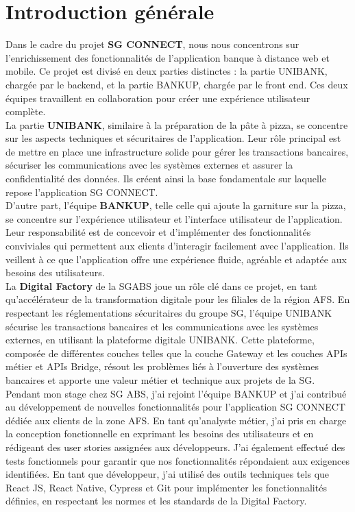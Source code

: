 \chapter*{Introduction générale}
\label{chap:introduction}
Dans le cadre du projet \textbf{SG CONNECT}, nous nous concentrons sur l'enrichissement des fonctionnalités de l'application banque à distance web et mobile. Ce projet est divisé en deux parties distinctes : la partie UNIBANK, chargée par le backend, et la partie BANKUP, chargée par le front end. Ces deux équipes travaillent en collaboration pour créer une expérience utilisateur complète.\\

La partie \textbf{UNIBANK}, similaire à la préparation de la pâte à pizza, se concentre sur les aspects techniques et sécuritaires de l'application. Leur rôle principal est de mettre en place une infrastructure solide pour gérer les transactions bancaires, sécuriser les communications avec les systèmes externes et assurer la confidentialité des données. Ils créent ainsi la base fondamentale sur laquelle repose l'application SG CONNECT.\\

D'autre part, l'équipe \textbf{BANKUP}, telle celle qui ajoute la garniture sur la pizza, se concentre sur l'expérience utilisateur et l'interface utilisateur de l'application. Leur responsabilité est de concevoir et d'implémenter des fonctionnalités conviviales qui permettent aux clients d'interagir facilement avec l'application. Ils veillent à ce que l'application offre une expérience fluide, agréable et adaptée aux besoins des utilisateurs.\\

La \textbf{Digital Factory} de la SGABS joue un rôle clé dans ce projet, en tant qu'accélérateur de la transformation digitale pour les filiales de la région AFS. En respectant les réglementations sécuritaires du groupe SG, l'équipe UNIBANK sécurise les transactions bancaires et les communications avec les systèmes externes, en utilisant la plateforme digitale UNIBANK. Cette plateforme, composée de différentes couches telles que la couche Gateway et les couches APIs métier et APIs Bridge, résout les problèmes liés à l'ouverture des systèmes bancaires et apporte une valeur métier et technique aux projets de la SG.\\

Pendant mon stage chez SG ABS, j'ai rejoint l'équipe BANKUP et j'ai contribué au développement de nouvelles fonctionnalités pour l'application SG CONNECT dédiée aux clients de la zone AFS. En tant qu'analyste métier, j'ai pris en charge la conception fonctionnelle en exprimant les besoins des utilisateurs et en rédigeant des user stories assignées aux développeurs. J'ai également effectué des tests fonctionnels pour garantir que nos fonctionnalités répondaient aux exigences identifiées. En tant que développeur, j'ai utilisé des outils techniques tels que React JS, React Native, Cypress et Git pour implémenter les fonctionnalités définies, en respectant les normes et les standards de la Digital Factory.\\

